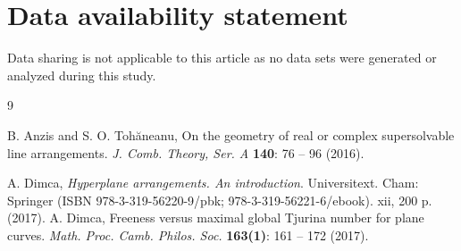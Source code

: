 \documentclass[11pt]{article}
\theoremstyle{plain}
\theoremstyle{definition}
\theoremstyle{remark}
\begin{document}
\section*{Data availability statement}
Data sharing is not applicable to this article as no data sets were generated or analyzed during this study.
\begin{thebibliography}{9}

B. Anzis and S. O. Toh\u aneanu, On the geometry of real or complex supersolvable line arrangements. \textit{J. Comb. Theory, Ser. A} \textbf{140}: 76 -- 96 (2016).

A. Dimca,  \textit{Hyperplane arrangements. An introduction}. Universitext. Cham: Springer (ISBN 978-3-319-56220-9/pbk; 978-3-319-56221-6/ebook). xii, 200 p. (2017).
A. Dimca, Freeness versus maximal global Tjurina number for plane curves. \textit{Math. Proc. Camb. Philos. Soc.} \textbf{163(1)}: 161 -- 172 (2017).


\end{thebibliography}
\end{document}
